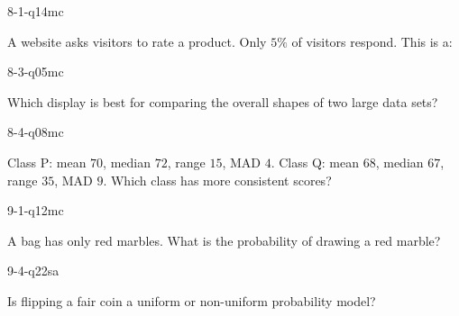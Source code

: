 \begin{practiceQuestion}{8-1-q14}{mc}
\begin{questionText}
A website asks visitors to rate a product. Only $5\%$ of visitors respond. This is a:
\end{questionText}
\end{practiceQuestion}

\begin{practiceQuestion}{8-3-q05}{mc}
\begin{questionText}
Which display is best for comparing the overall shapes of two large data sets?
\end{questionText}
\end{practiceQuestion}

\begin{practiceQuestion}{8-4-q08}{mc}
\begin{questionText}
Class P: mean $70$, median $72$, range $15$, MAD $4$.
Class Q: mean $68$, median $67$, range $35$, MAD $9$.
Which class has more consistent scores?
\end{questionText}
\end{practiceQuestion}

\begin{practiceQuestion}{9-1-q12}{mc}
\begin{questionText}
A bag has only red marbles. What is the probability of drawing a red marble?
\end{questionText}
\end{practiceQuestion}

\begin{practiceQuestion}{9-4-q22}{sa}
\begin{questionText}
Is flipping a fair coin a uniform or non-uniform probability model?
\end{questionText}
\end{practiceQuestion}

